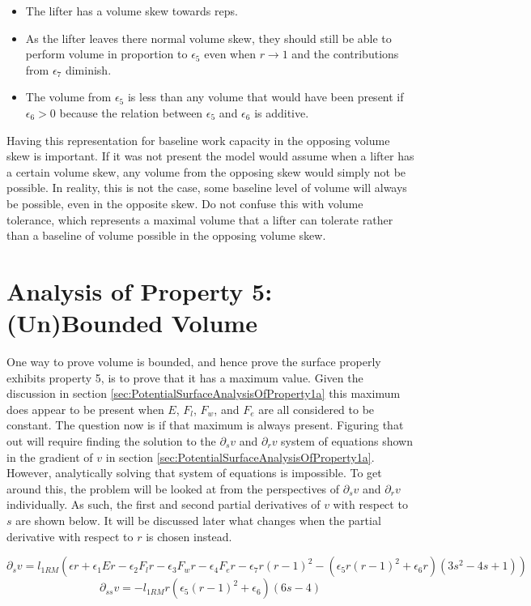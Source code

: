 \begin{itemize}
    \item The lifter has a volume skew towards reps.
    \item As the lifter leaves there normal volume skew, they should still be able to perform volume in proportion to $\epsilon_5$ even when $r\to 1$ and the contributions from $\epsilon_7$ diminish.
    \item The volume from $\epsilon_5$ is less than any volume that would have been present if $\epsilon_6>0$ because the relation between $\epsilon_5$ and $\epsilon_6$ is additive.
\end{itemize}

Having this representation for baseline work capacity in the opposing volume skew is important. If it was not present the model would assume when a lifter has a certain volume skew, any volume from the opposing skew would simply not be possible. In reality, this is not the case, some baseline level of volume will always be possible, even in the opposite skew. Do not confuse this with volume tolerance, which represents a maximal volume that a lifter can tolerate rather than a baseline of volume possible in the opposing volume skew.

\section{Analysis of Property 5: (Un)Bounded Volume}
\label{sec:PotentialSurfaceUnboundedVolume}

One way to prove volume is bounded, and hence prove the surface properly exhibits property 5, is to prove that it has a maximum value. Given the discussion in section \ref{sec:PotentialSurfaceAnalysisOfProperty1a} this maximum does appear to be present when $E$, $F_l$, $F_w$, and $F_e$ are all considered to be constant. The question now is if that maximum is always present. Figuring that out will require finding the solution to the $\partial_sv$ and $\partial_rv$ system of equations shown in the gradient of $v$ in section \ref{sec:PotentialSurfaceAnalysisOfProperty1a}. However, analytically solving that system of equations is impossible. To get around this, the problem will be looked at from the perspectives of $\partial_sv$ and $\partial_rv$ individually. As such, the first and second partial derivatives of $v$ with respect to $s$ are shown below. It will be discussed later what changes when the partial derivative with respect to $r$ is chosen instead.

\begin{equation*}
    \partial_s v = l_{1RM} \left(
			\epsilon r+
			\epsilon_1 Er-
			\epsilon_2 F_l r-
			\epsilon_3 F_w r-
			\epsilon_4 F_e r-
			\epsilon_7 r(r-1)^2	-
			\left( 
				\epsilon_5 r(r-1)^2+\epsilon_6 r
			\right)
			(3s^2-4s+1)
		\right)
\end{equation*}
\begin{equation*}
    \partial_{ss}v=-l_{1RM} r
    		\left( 
			\epsilon_5 (r-1)^2+\epsilon_6
		\right)
		(6s-4)
\end{equation*}

